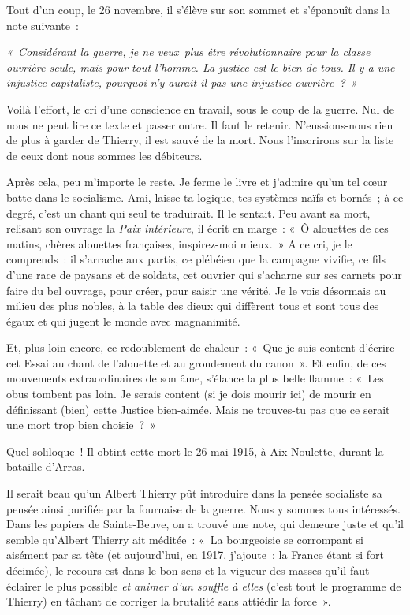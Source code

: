 \documentclass[french,twoside]{book} %
\newcommand\chapterclose{} %
\begin{document}
\noindent Tout d’un coup, le 26 novembre, il s’élève sur son sommet et s’épanouît dans la note suivante :‌\par
\par
{\itshape « Considérant la guerre, je ne veux plus être révolutionnaire pour la classe ouvrière seule, mais pour tout l’homme. La justice est le bien de tous. Il y a une injustice capitaliste, pourquoi n’y aurait-il pas une injustice ouvrière ? »}\par
Voilà l’effort, le cri d’une conscience en travail, sous le coup de la guerre. Nul de nous ne peut lire ce texte et passer outre. Il faut le retenir. N’eussions-nous rien de plus à garder de Thierry, il est sauvé de la mort. Nous l’inscrirons sur la liste de ceux dont nous sommes les débiteurs.‌\par
Après cela, peu m’importe le reste. Je ferme le livre et j’admire qu’un tel cœur batte dans le socialisme. Ami, laisse ta logique, tes systèmes naïfs et bornés ; à ce degré, c’est un chant qui seul te traduirait. Il le sentait. Peu avant sa mort, relisant son ouvrage la {\itshape Paix intérieure}, il écrit en marge : « Ô alouettes de ces matins, chères alouettes françaises, inspirez-moi mieux. » A ce cri, je le comprends : il s’arrache aux partis, ce plébéien que la campagne vivifie, ce fils d’une race de paysans et de soldats, cet ouvrier qui s’acharne sur ses carnets pour faire du bel ouvrage, pour créer, pour saisir une vérité. Je le vois désormais au milieu des plus nobles, à la table des dieux qui diffèrent tous et sont tous des égaux et qui jugent le monde avec magnanimité.‌\par
Et, plus loin encore, ce redoublement de chaleur : « Que je suis content d’écrire cet Essai au chant de l’alouette et au grondement du canon ». Et enfin, de ces mouvements extraordinaires de son âme, s’élance la plus belle flamme : « Les obus tombent pas loin. Je serais content (si je dois mourir ici) de mourir en définissant (bien) cette Justice bien-aimée. Mais ne trouves-tu pas que ce serait une mort trop bien choisie ? »‌\par
Quel soliloque ! Il obtint cette mort le 26 mai 1915, à Aix-Noulette, durant la bataille d’Arras.‌\par
Il serait beau qu’un Albert Thierry pût introduire dans la pensée socialiste sa pensée ainsi purifiée par la fournaise de la guerre. Nous y sommes tous intéressés. Dans les papiers de Sainte-Beuve, on a trouvé une note, qui demeure juste et qu’il semble qu’Albert Thierry ait méditée : « La bourgeoisie se corrompant si aisément par sa tête (et aujourd’hui, en 1917, j’ajoute : la France étant si fort décimée), le recours est dans le bon sens et la vigueur des masses qu’il faut éclairer le plus possible {\itshape et} {\itshape animer d’un souffle à elles} (c’est tout le programme de Thierry) en tâchant de corriger la brutalité sans attiédir la force ».‌
\chapterclose
\end{document}

